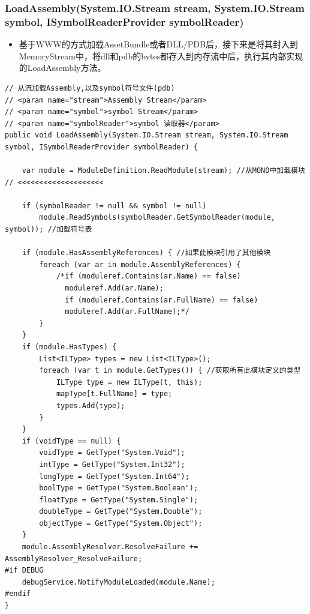 \documentclass[9pt, b5paper]{article}
\begin{document}
\subsubsection{LoadAssembly(System.IO.Stream stream, System.IO.Stream symbol, ISymbolReaderProvider symbolReader)}
\label{sec-9-1-2}
\begin{itemize}
\item 基于WWW的方式加载AssetBundle或者DLL/PDB后，接下来是将其封入到MemoryStream中，将dll和pdb的bytes都存入到内存流中后，执行其内部实现的LoadAssembly方法。
\end{itemize}
\begin{verbatim}
// 从流加载Assembly,以及symbol符号文件(pdb)
// <param name="stream">Assembly Stream</param>
// <param name="symbol">symbol Stream</param>
// <param name="symbolReader">symbol 读取器</param>
public void LoadAssembly(System.IO.Stream stream, System.IO.Stream symbol, ISymbolReaderProvider symbolReader) {

    var module = ModuleDefinition.ReadModule(stream); //从MONO中加载模块 // <<<<<<<<<<<<<<<<<<<< 

    if (symbolReader != null && symbol != null)  
        module.ReadSymbols(symbolReader.GetSymbolReader(module, symbol)); //加载符号表

    if (module.HasAssemblyReferences) { //如果此模块引用了其他模块 
        foreach (var ar in module.AssemblyReferences) {
            /*if (moduleref.Contains(ar.Name) == false)
              moduleref.Add(ar.Name);
              if (moduleref.Contains(ar.FullName) == false)
              moduleref.Add(ar.FullName);*/
        }
    }
    if (module.HasTypes) {
        List<ILType> types = new List<ILType>();
        foreach (var t in module.GetTypes()) { //获取所有此模块定义的类型 
            ILType type = new ILType(t, this);
            mapType[t.FullName] = type;
            types.Add(type);
        }
    }
    if (voidType == null) {
        voidType = GetType("System.Void");
        intType = GetType("System.Int32");
        longType = GetType("System.Int64");
        boolType = GetType("System.Boolean");
        floatType = GetType("System.Single");
        doubleType = GetType("System.Double");
        objectType = GetType("System.Object");
    }
    module.AssemblyResolver.ResolveFailure += AssemblyResolver_ResolveFailure;
#if DEBUG
    debugService.NotifyModuleLoaded(module.Name);
#endif
}
\end{verbatim}
\end{document}
